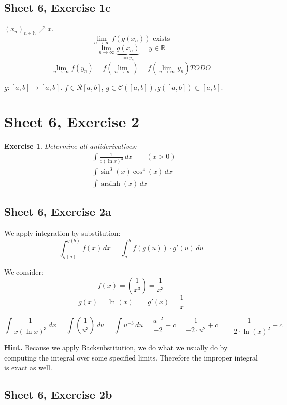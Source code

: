 \documentclass{article}
\newtheorem{ex}{Exercise} %
\begin{document}
\subsection{Sheet 6, Exercise 1c}
$(x_n)_{n\in\mathbb N} \nearrow x$.
\[ \lim_{n\to\infty} f(g(x_n)) \text{ exists} \]
\[ \lim_{n\to\infty} \underbrace{g(x_n)}_{\eqqcolon y_n} = y \in \mathbb R \]
\[ \lim_{n\to\infty} f(y_n) = f(\lim_{n\to\infty}) = f(\lim_{n\to\infty} y_n) TODO \]

$g: [a,b] \to [a,b]$.
$f \in \mathcal R[a,b]$, $g \in \mathcal C([a,b]), g([a,b]) \subset [a,b]$.


\section{Sheet 6, Exercise 2}
\begin{ex}
  Determine all antiderivatives:
  \begin{align}
    &\int \frac{1}{x (\ln{x})^3} \, dx \qquad (x > 0) \\
    &\int \sin^3(x) \cos^4(x) \, dx \\
    &\int \operatorname{arsinh}(x) \, dx
  \end{align}
\end{ex}

\subsection{Sheet 6, Exercise 2a}

We apply integration by substitution:
\[ \int_{g(a)}^{g(b)} f(x) \, dx = \int_a^b f(g(u)) \cdot g'(u) \, du \]

We consider:
\[ f(x) = \left(\frac1{x^3}\right) = \frac1{x^3} \]
\[ g(x) = \ln(x) \qquad g'(x) = \frac1x \]

\[ \int \frac{1}{x (\ln{x})^3} \, dx = \int \left(\frac1{u^3}\right) \, du = \int u^{-3} \, du = \frac{u^{-2}}{-2} + c = \frac{1}{-2 \cdot u^2} + c = \frac{1}{-2 \cdot \ln(x)^2} + c \]

\textbf{Hint.} Because we apply Backsubstitution, we do what we usually do by computing the integral over some specified limits. Therefore the improper integral is exact as well.

\subsection{Sheet 6, Exercise 2b}
\end{document}
